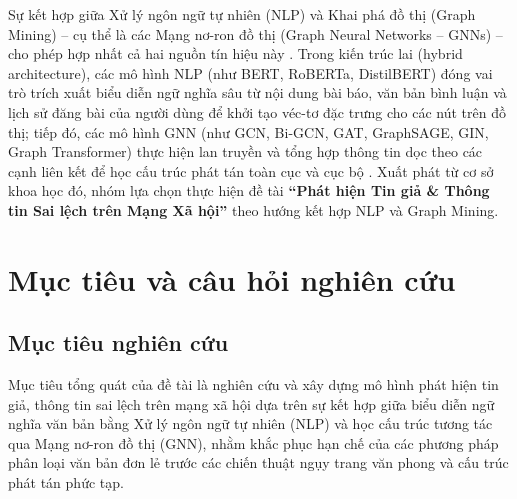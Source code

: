 \documentclass[11pt,a4paper]{extreport}
\begin{document}
Sự kết hợp giữa Xử lý ngôn ngữ tự nhiên (NLP) và Khai phá đồ thị (Graph Mining) -- cụ thể là các Mạng nơ-ron đồ thị (Graph Neural Networks -- GNNs) -- cho phép hợp nhất cả hai nguồn tín hiệu này \cite{noauthor_disinformation_2024, noauthor_dual_2025}. Trong kiến trúc lai (hybrid architecture), các mô hình NLP (như BERT, RoBERTa, DistilBERT) đóng vai trò trích xuất biểu diễn ngữ nghĩa sâu từ nội dung bài báo, văn bản bình luận và lịch sử đăng bài của người dùng để khởi tạo véc-tơ đặc trưng cho các nút trên đồ thị; tiếp đó, các mô hình GNN (như GCN, Bi-GCN, GAT, GraphSAGE, GIN, Graph Transformer) thực hiện lan truyền và tổng hợp thông tin dọc theo các cạnh liên kết để học cấu trúc phát tán toàn cục và cục bộ \cite{noauthor_disinformation_2024, noauthor_integrating_2025, noauthor_co-attention_2025}. Xuất phát từ cơ sở khoa học đó, nhóm lựa chọn thực hiện đề tài \textbf{``Phát hiện Tin giả \& Thông tin Sai lệch trên Mạng Xã hội''} theo hướng kết hợp NLP và Graph Mining.

\section{Mục tiêu và câu hỏi nghiên cứu}

\subsection{Mục tiêu nghiên cứu}
Mục tiêu tổng quát của đề tài là nghiên cứu và xây dựng mô hình phát hiện tin giả, thông tin sai lệch trên mạng xã hội dựa trên sự kết hợp giữa biểu diễn ngữ nghĩa văn bản bằng Xử lý ngôn ngữ tự nhiên (NLP) và học cấu trúc tương tác qua Mạng nơ-ron đồ thị (GNN), nhằm khắc phục hạn chế của các phương pháp phân loại văn bản đơn lẻ trước các chiến thuật ngụy trang văn phong và cấu trúc phát tán phức tạp.
\end{document}
